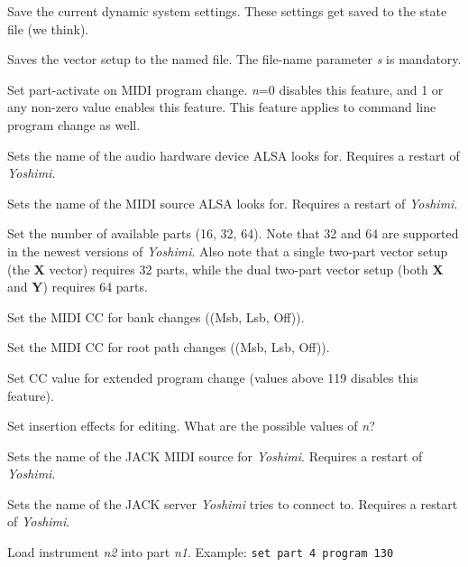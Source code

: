       Save the current dynamic system settings.
      These settings get saved to the state file (we think).

      Saves the vector setup to the named file.
      The file-name parameter \textsl{s} is mandatory.

      Set part-activate on MIDI program change.
      \textsl{n}=0 disables this feature, and
      1 or any non-zero value enables this feature.
      This feature applies to command line program change as well.

      Sets the name of the audio hardware device ALSA looks for.
      Requires a restart of \textsl{Yoshimi}.

      Sets the name of the MIDI source ALSA looks for.
      Requires a restart of \textsl{Yoshimi}.

      Set the number of available parts (16, 32, 64).
      Note that 32 and 64 are supported in the newest versions of
      \textsl{Yoshimi}.  Also note that a single two-part vector setup (the
      \textbf{X} vector) requires 32 parts, while the dual two-part vector
      setup (both \textbf{X} and \textbf{Y}) requires 64 parts.

      Set the MIDI CC for bank changes ((Msb, Lsb, Off)).

      Set the MIDI CC for root path changes ((Msb, Lsb, Off)).

      Set CC value for extended program change (values above 119 disables this
      feature).

      Set insertion effects for editing.
      What are the possible values of \textsl{n}?

      Sets the name of the JACK MIDI source for \textsl{Yoshimi}.
      Requires a restart of \textsl{Yoshimi}.

      Sets the name of the JACK server \textsl{Yoshimi} tries to connect to.
      Requires a restart of \textsl{Yoshimi}.

      Load instrument \textsl{n2} into part \textsl{n1}.
      Example: \texttt{set part 4 program 130}

